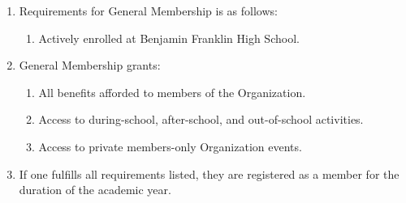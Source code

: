 
\begin{enumerate}
	\item Requirements for General Membership is as follows:
		\begin{enumerate}
			\item Actively enrolled at Benjamin Franklin High School.
		\end{enumerate}

	\item General Membership grants:
		\begin{enumerate}
			\item All benefits afforded to members of the Organization.

			\item Access to during-school, after-school, and out-of-school activities.

			\item Access to private members-only Organization events.
		\end{enumerate}

	\item If one fulfills all requirements listed, they are registered as a member
		for the duration of the academic year.
\end{enumerate}

